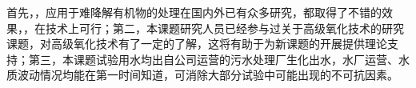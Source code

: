 首先，，应用于难降解有机物的处理在国内外已有众多研究，都取得了不错的效果，，在技术上可行；第二，本课题研究人员已经参与过关于高级氧化技术的研究课题，对高级氧化技术有了一定的了解，这将有助于为新课题的开展提供理论支持；第三，本课题试验用水均出自公司运营的污水处理厂生化出水，水厂运营、水质波动情况均能在第一时间知道，可消除大部分试验中可能出现的不可抗因素。